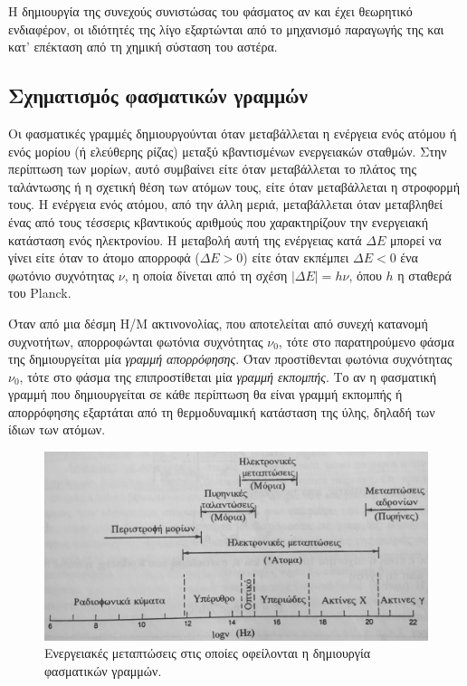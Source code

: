Η δημιουργία της συνεχούς συνιστώσας του φάσματος αν και έχει θεωρητικό ενδιαφέρον, οι ιδιότητές της λίγο εξαρτώνται από το μηχανισμό παραγωγής της και κατ' επέκταση από τη χημική σύσταση του αστέρα.

\subsection{Σχηματισμός φασματικών γραμμών}
Οι φασματικές γραμμές δημιουργούνται όταν μεταβάλλεται η ενέργεια ενός ατόμου ή ενός μορίου (ή ελεύθερης ρίζας) μεταξύ κβαντισμένων ενεργειακών σταθμών. Στην περίπτωση των μορίων, αυτό συμβαίνει είτε όταν μεταβάλλεται το πλάτος της ταλάντωσης ή η σχετική θέση των ατόμων τους, είτε όταν μεταβάλλεται η στροφορμή τους. Η ενέργεια ενός ατόμου, από την άλλη μεριά, μεταβάλλεται όταν μεταβληθεί ένας από τους τέσσερις κβαντικούς αριθμούς που χαρακτηρίζουν την ενεργειακή κατάσταση ενός ηλεκτρονίου. Η μεταβολή αυτή της ενέργειας κατά $\Delta E$ μπορεί να γίνει είτε όταν το άτομο απορροφά ($\Delta E > 0$) είτε όταν εκπέμπει $\Delta E < 0$ ένα φωτόνιο συχνότητας $\nu$, η οποία δίνεται από τη σχέση $|\Delta E| = h\nu$, όπου $h$ η σταθερά του Planck.

Όταν από μια δέσμη Η/Μ ακτινονολίας, που αποτελείται από συνεχή κατανομή συχνοτήτων, απορροφώνται φωτόνια συχνότητας $\nu_0$, τότε στο παρατηρούμενο φάσμα της δημιουργείται μία \textit{γραμμή απορρόφησης}. Όταν προστίθενται φωτόνια συχνότητας $\nu_0$, τότε στο φάσμα της επιπροστίθεται μία \textit{γραμμή εκπομπής}. Το αν η φασματική γραμμή που δημιουργείται σε κάθε περίπτωση θα είναι γραμμή εκπομπής ή απορρόφησης εξαρτάται από τη θερμοδυναμική κατάσταση της ύλης, δηλαδή των ίδιων των ατόμων.

\begin{figure}[h]
    \centering
    \includegraphics[scale=0.1]{Figures/energy_transitions.jpeg}
    \caption{Ενεργειακές μεταπτώσεις στις οποίες οφείλονται η δημιουργία φασματικών γραμμών.}
    \label{fig:energy_transitions}
\end{figure}

